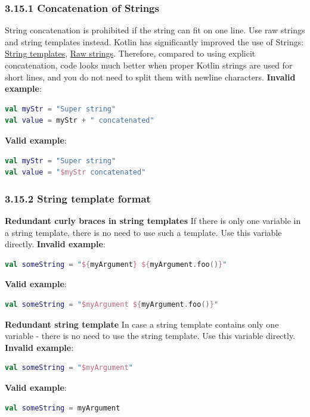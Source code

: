 \subsubsection*{\textbf{3.15.1 Concatenation of Strings}}
\leavevmode\newline
\label{sec:3.15.1}
String concatenation is prohibited if the string can fit on one line. Use raw strings and string templates instead. Kotlin has significantly improved the use of Strings:
\href{https://kotlinlang.org/docs/reference/basic-types.html#string-templates}{String templates}, \href{https://kotlinlang.org/docs/reference/basic-types.html#string-literals}{Raw strings}.
Therefore, compared to using explicit concatenation, code looks much better when proper Kotlin strings are used for short lines, and you do not need to split them with newline characters.
\textbf{Invalid example}:
\begin{lstlisting}[language=Kotlin]
val myStr = "Super string"
val value = myStr + " concatenated"
\end{lstlisting}
\textbf{Valid example}:
\begin{lstlisting}[language=Kotlin]
val myStr = "Super string"
val value = "$myStr concatenated"
\end{lstlisting}
\subsubsection*{\textbf{3.15.2 String template format}}
\leavevmode\newline
\label{sec:3.15.2}
\textbf{Redundant curly braces in string templates}
If there is only one variable in a string template, there is no need to use such a template. Use this variable directly.
\textbf{Invalid example}:
\begin{lstlisting}[language=Kotlin]
val someString = "${myArgument} ${myArgument.foo()}"
\end{lstlisting}
\textbf{Valid example}:
\begin{lstlisting}[language=Kotlin]
val someString = "$myArgument ${myArgument.foo()}"
\end{lstlisting}
\textbf{Redundant string template}
In case a string template contains only one variable - there is no need to use the string template. Use this variable directly.
\textbf{Invalid example}:
\begin{lstlisting}[language=Kotlin]
val someString = "$myArgument"
\end{lstlisting}
\textbf{Valid example}:
\begin{lstlisting}[language=Kotlin]
val someString = myArgument
\end{lstlisting}
